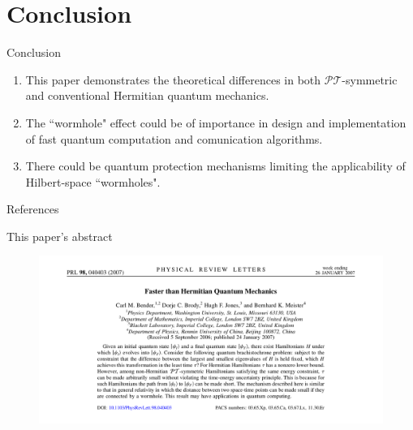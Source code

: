 \documentclass[10pt]{beamer}
\begin{document}
\section{Conclusion}
\begin{frame}{Conclusion}
\begin{enumerate}
    \item This paper demonstrates the theoretical differences in both $\mathcal{PT}$-symmetric and conventional Hermitian quantum mechanics.\\
    \item The ``wormhole" effect could be of importance in design and implementation of fast quantum computation and comunication algorithms.\\
    \item There could be quantum protection mechanisms limiting the applicability of Hilbert-space ``wormholes".
\end{enumerate}
\end{frame}

\begin{frame}{References} 
    \nocite{*}
    
    
\end{frame}

\pause

\begin{frame}{This paper's abstract}
\begin{figure}
    \hspace{-4.8em}
    \includegraphics[width=1.13\textwidth]{paper.png}
    \\
    \tiny{}
    \end{figure}
\end{frame}
\end{document}
